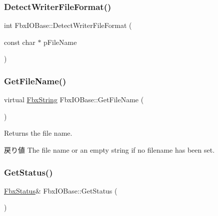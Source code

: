 \mbox{\label{class_fbx_i_o_base_ab33025566a08451ec2cffedfc1130ad4}} 
\subsubsection{\texorpdfstring{Detect\+Writer\+File\+Format()}{DetectWriterFileFormat()}}
{\footnotesize\ttfamily int Fbx\+I\+O\+Base\+::\+Detect\+Writer\+File\+Format (\begin{DoxyParamCaption}\item[{const char $\ast$}]{p\+File\+Name }\end{DoxyParamCaption})\hspace{0.3cm}{\ttfamily [protected]}}

\mbox{\label{class_fbx_i_o_base_ace2742dc782d87dc5bb08bceacb451b7}} 
\subsubsection{\texorpdfstring{Get\+File\+Name()}{GetFileName()}}
{\footnotesize\ttfamily virtual \hyperlink{class_fbx_string}{Fbx\+String} Fbx\+I\+O\+Base\+::\+Get\+File\+Name (\begin{DoxyParamCaption}{ }\end{DoxyParamCaption})\hspace{0.3cm}{\ttfamily [virtual]}}

Returns the file name. \begin{DoxyReturn}{戻り値}
The file name or an empty string if no filename has been set. 
\end{DoxyReturn}
\mbox{\label{class_fbx_i_o_base_a078e47a99b119278ca3ee639e2da5b6d}} 
\subsubsection{\texorpdfstring{Get\+Status()}{GetStatus()}}
{\footnotesize\ttfamily \hyperlink{class_fbx_status}{Fbx\+Status}\& Fbx\+I\+O\+Base\+::\+Get\+Status (\begin{DoxyParamCaption}{ }\end{DoxyParamCaption})\hspace{0.3cm}{\ttfamily [inline]}}



